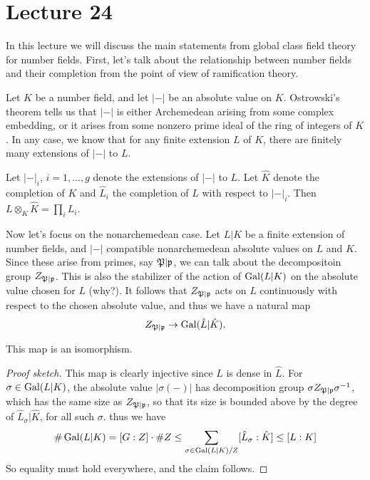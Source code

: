 \section{Lecture 24}

In this lecture we will discuss the main statements from global class field theory for number fields.
First, let's talk about the relationship between number fields and their completion from the point of view of ramification theory.

Let $K$ be a number field, and let $|-|$ be an absolute value on $K$.
Ostrowski's theorem tells us that $|-|$ is either Archemedean arising from some complex embedding, or it arises from some nonzero prime ideal of the ring of integers of $K$.
In any case, we know that for any finite extension $L$ of $K$, there are finitely many extensions of $|-|$ to $L$.

\begin{proposition}
  Let $|-|_{i}$, $i = 1,\ldots,g$ denote the extensions of $|-|$ to $L$.
  Let $\hat K$ denote the completion of $K$ and $\hat L_{i}$ the completion of $L$ with respect to $|-|_{i}$.
  Then $L \otimes_{K} \hat K = \prod_{i} L_{i}$.
\end{proposition}

Now let's focus on the nonarchemedean case.
Let $L|K$ be a finite extension of number fields, and $|-|$ compatible nonarchemedean absolute values on $L$ and $K$.
Since these arise from primes, say $\mathfrak{P}|\mathfrak{p}$, we can talk about the decompositoin group $Z_{\mathfrak{P}|\mathfrak{p}}$.
This is also the stabilizer of the action of $\operatorname{Gal}(L|K)$ on the absolute value chosen for $L$ (why?).
It follows that $Z_{\mathfrak{P}|\mathfrak{p}}$ acts on $L$ continuously with respect to the chosen absolute value, and thus we have a natural map
\[ Z_{\mathfrak{P}|\mathfrak{p}} \to \operatorname{Gal}(\hat L|\hat K). \]
\begin{proposition}
  This map is an isomorphism.
\end{proposition}
\begin{proof}[Proof sketch]
  This map is clearly injective since $L$ is dense in $\hat L$.
  For $\sigma \in \operatorname{Gal}(L|K)$, the absolute value $|\sigma(-)|$ has decomposition group $\sigma Z_{\mathfrak{P}|\mathfrak{p}} \sigma^{-1}$, which has the same size as $Z_{\mathfrak{P}|\mathfrak{p}}$, so that its size is bounded above by the degree of $\hat L_{\sigma}|\hat K$, for all such $\sigma$.
  thus we have
  \[ \# \operatorname{Gal}(L|K) = [G:Z] \cdot \# Z \leq \sum_{\sigma \in \operatorname{Gal}(L|K)/Z} [\hat L_{\sigma}:\hat K] \leq [L:K] \]
  So equality must hold everywhere, and the claim follows.
\end{proof}

